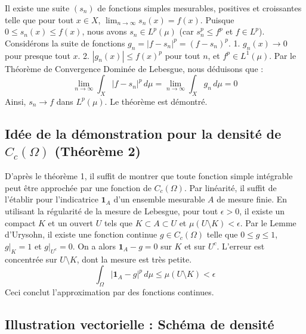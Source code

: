 \documentclass[11pt,a4paper]{article}
\begin{document}
Il existe une suite $(s_n)$ de fonctions simples mesurables, positives et croissantes telle que pour tout $x \in X$, $\lim_{n \to \infty} s_n(x) = f(x)$.
Puisque $0 \le s_n(x) \le f(x)$, nous avons $s_n \in L^p(\mu)$ (car $s_n^p \le f^p$ et $f \in L^p$).
Considérons la suite de fonctions $g_n = |f - s_n|^p = (f - s_n)^p$.
1. $g_n(x) \to 0$ pour presque tout $x$.
2. $|g_n(x)| \le f(x)^p$ pour tout $n$, et $f^p \in L^1(\mu)$.
Par le Théorème de Convergence Dominée de Lebesgue, nous déduisons que :
$$ \lim_{n \to \infty} \int_X |f - s_n|^p \, d\mu = \lim_{n \to \infty} \int_X g_n \, d\mu = 0 $$
Ainsi, $s_n \to f$ dans $L^p(\mu)$. Le théorème est démontré.

\subsection{Idée de la démonstration pour la densité de $C_c(\Omega)$ (Théorème 2)}

D'après le théorème 1, il suffit de montrer que toute fonction simple intégrable peut être approchée par une fonction de $C_c(\Omega)$. Par linéarité, il suffit de l'établir pour l'indicatrice $\mathbf{1}_A$ d'un ensemble mesurable $A$ de mesure finie.
En utilisant la régularité de la mesure de Lebesgue, pour tout $\epsilon > 0$, il existe un compact $K$ et un ouvert $U$ tels que $K \subset A \subset U$ et $\mu(U \setminus K) < \epsilon$.
Par le Lemme d'Urysohn, il existe une fonction continue $g \in C_c(\Omega)$ telle que $0 \le g \le 1$, $g|_K = 1$ et $g|_{U^c} = 0$.
On a alors $\mathbf{1}_A - g = 0$ sur $K$ et sur $U^c$. L'erreur est concentrée sur $U \setminus K$, dont la mesure est très petite.
$$ \int_\Omega |\mathbf{1}_A - g|^p \, d\mu \le \mu(U \setminus K) < \epsilon $$
Ceci conclut l'approximation par des fonctions continues.

\subsection{Illustration vectorielle : Schéma de densité}

\end{document}

